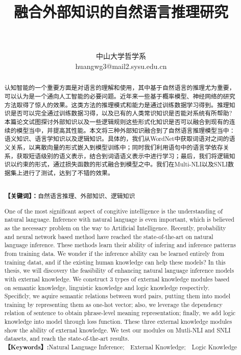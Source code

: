 \documentclass[UTF8,11pt,a4paper,nofonts]{ctexart}
\title{\zihao{3}\textbf{融合外部知识的自然语言推理研究}}
\date{\quad}
\author{\vspace{-0.5em}\zihao{-4}{黄文冠 }\\ 
\vspace{-0.5em}\zihao{-4}{指导老师：鲜于波}\\ 
\vspace{-0.5em}\zihao{5}中山大学哲学系\\
\zihao{5}huangwg3@mail2.sysu.edu.cn}
\begin{document}
\setlength{\parskip}{0pt}
\linespread{1.6}

\maketitle
\thispagestyle{empty}


\begin{abstract}
{



认知智能的一个重要方面是对语言的理解和使用，其中基于自然语言的推理尤为重要，可以认为是一个通向人工智能的必要问题。近年来一些基于概率模型、神经网络的研究方法取得了惊人的效果。这类方法的推理模式和能力是通过训练数据学习得到。推理知识是否可以完全通过训练数据习得，以及已有的人类常识知识是否能对系统有所帮助?本篇论文试图探讨外部知识以及一些逻辑规则这些形式化知识是否可以融合到现有的连续的模型当中，并提高其性能。本文将三种外部知识融合到了自然语言推理模型当中：语义知识、语言学知识以及逻辑知识。具体的，我们从WordNet中获取词语对之间的语义关系，以离散向量的形式嵌入到模型训练中；同时我们利用语句中的语言学依存关系，获取短语级别的语义表示，结合到词语语义表示中进行学习；最后，我们将逻辑知识以约束的形式，通过损失函数的形式融合到模型之中。我们在Multi-NLI以及SNLI数据集上进行了测试，达到了不错的效果。
}\\
\textbf{{【关键词】：}}{自然语言推理、外部知识、逻辑知识}
\end{abstract}

\newpage
\begin{abstract}
{ One of the most significant aspect of congitive intelligence is the understanding of natural language. Inference with natural language is even important, which is believed as the necessary problem on the way to Artificial Intelligence. Recently, probability and neural network based method have reached the state-of-the-art on natural language inference. These methods learn their ability of infering and inference patterns from training data. We wonder if the inference ability can be learned entirely from training datat, and if the existing human knowledge can help these models? In this thesis, we will discovery the feasibility of enhancing natural language inference models with external knowledge. We construct 3 types of external knowledge modules based on semantic knowledge, linguistic knowledge and logic knowledge respectivly. Specificly, we aquire semantic relations between word pairs, putting them into model training by representing them as one-hot vector; also, we leverage the dependency relation of sentence to obtain phrase-level meaning representation; finally, we add logic knowledge into model through loss function. These three external knowledge modules show the ability of external knowledge. We test our modules on Mutli-NLI and SNLI datasets, and reach the state-of-the-art results.}\\
\textbf{{【Keywords】:}}Natural Language Inference;\ \ External Knowledge;\ \ Logic Knowledge
\end{abstract}
\end{document}
